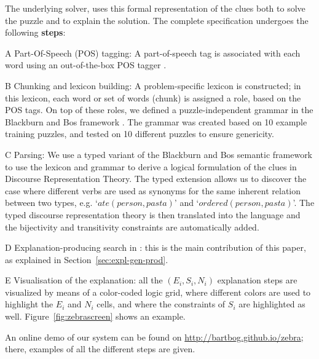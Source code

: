 The underlying solver, \idp\cite{idp} uses this formal representation of the clues both to solve the puzzle and to explain the solution. 
The complete specification undergoes the following \textbf{steps}:
\begin{compactenum}
	\item[A] Part-Of-Speech (POS) tagging: A part-of-speech tag is associated with each word using an out-of-the-box POS tagger \cite{DBLP:journals/coling/MarcusSM94}.
	\item[B] Chunking and lexicon building: A problem-specific lexicon is constructed; in this lexicon, each word or set of words (chunk) is assigned a role, based on the POS tags. On top of these roles, we defined a puzzle-independent grammar in the Blackburn and Bos framework \cite{Blackburn2005,Blackburn2006}. The grammar was created based on 10 example training puzzles, and tested on 10 different puzzles to ensure genericity. 
	\item[C] Parsing: We use a typed variant of the Blackburn and Bos semantic framework to use the lexicon and grammar to derive a logical formulation of the clues in Discourse Representation Theory. The typed extension allows us to discover the case where different verbs are used as synonyms for the same inherent relation between two types, e.g. `$ate(person, pasta)$' and `$ordered(person, pasta)$'. The typed discourse representation theory is then translated into the \idp language and the bijectivity and transitivity constraints are automatically added. 
	\item[D] Explanation-producing search in \idp: this is the main contribution of this paper, as explained in Section~\ref{sec:expl-gen-prod}.
	\item[E] Visualisation of the explanation: all the $(E_i, S_i, N_i)$ explanation steps are visualized by means of a color-coded logic grid, where different colors are used to highlight the $E_i$ and $N_i$ cells, and where the constraints of $S_i$ are highlighted as well. Figure~\ref{fig:zebrascreen} shows an example.
\end{compactenum}

 An online demo of our system can be found on \url{http://bartbog.github.io/zebra}; there, examples of all the different steps are given. 

